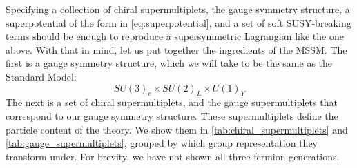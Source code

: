 Specifying a collection of chiral supermultiplets, the gauge symmetry structure, a superpotential of the form in \eqref{eq:superpotential}, and a set of soft SUSY-breaking terms should be enough to reproduce a supersymmetric Lagrangian like the one above. With that in mind, let us put together the ingredients of the MSSM. The first is a gauge symmetry structure, which we will take to be the same as the Standard Model:
\begin{equation*}
  SU(3)_c\times SU(2)_L\times U(1)_Y
\end{equation*}
The next is a set of chiral supermultiplets, and the gauge supermultiplets that correspond to our gauge symmetry structure. These supermultiplets define the particle content of the theory. We show them in \autoref{tab:chiral_supermultiplets} and \autoref{tab:gauge_supermultiplets}, grouped by which group representation they transform under. For brevity, we have not shown all three fermion generations.
